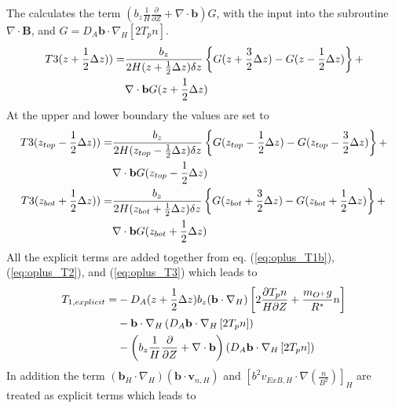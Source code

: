 %
The  calculates the term $\left(b_z
\frac{1}{H} \frac{\partial}{\partial Z} + \nabla \cdot \mathbf{b}
\right) G$, with the input into the subroutine $\nabla \cdot
\mathbf{B}$, and $G = D_A \mathbf{b}\cdot \nabla_H \left[ 2 T_p
n\right]$.
%
\begin{align}
  T3(z + \frac{1}{2} \Delta z)) = & \frac{b_z}{2 H(z + \frac{1}{2} \Delta z) \delta z} \left\{  G(z + \frac{3}{2} \Delta z) -
  G(z - \frac{1}{2} \Delta z)\right\} + \notag \\
  {}& \nabla \cdot \mathbf{b}
  G(z + \frac{1}{2} \Delta z) \label{eq:oplus_T3}
\end{align}
%
At the upper and lower boundary the values are set to
%
\begin{align}
  T3(z_{top} - \frac{1}{2} \Delta z)) = & \frac{b_z}{2 H(z_{top} -\frac{1}{2} \Delta z) \delta z} \left\{  G(z_{top} - \frac{1}{2} \Delta z) -
  G(z_{top} - \frac{3}{2} \Delta z)\right\} + \notag \\
  {}& \nabla \cdot \mathbf{b}
  G(z_{top} - \frac{1}{2} \Delta z) \label{eq:oplus_T3top} \\
  T3(z_{bot} + \frac{1}{2} \Delta z)) =& \frac{b_z}{2 H(z_{bot} +\frac{1}{2} \Delta z) \delta z}
  \left\{  G(z_{bot} + \frac{3}{2} \Delta z) -
  G(z_{bot} + \frac{1}{2} \Delta z)\right\} + \notag \\
  {} & \nabla \cdot \mathbf{b}
  G(z_{bot} + \frac{1}{2} \Delta z) \label{eq:oplus_T3bot}
\end{align}
%
All the explicit terms are added together from eq.
(\ref{eq:oplus_T1b}), (\ref{eq:oplus_T2}), and (\ref{eq:oplus_T3})
which leads to
%
\begin{align}
  T_{1,explicit} = & - D_A(z+\frac{1}{2} \Delta z) b_z ( \mathbf{b} \cdot \nabla_H ) \left[2 \frac{\partial T_p n}{H
 \partial Z} + \frac{m_{O^+}  g }{R^*} n \right] \notag \\
 {} & - \mathbf{b} \cdot \nabla_H \left( D_A \mathbf{b} \cdot \nabla_H
 \left[ 2 T_p n \right] \right)  \notag \\
 {} & - \left(b_z \frac{1}{H} \frac{\partial}{\partial Z} + \nabla \cdot
 \mathbf{b} \right) (D_A \mathbf{b}\cdot \nabla_H \left[ 2 T_p
 n\right]) \label{eq:oplus_exp1}
\end{align}
%
In addition the term $(\mathbf{b}_H \cdot \nabla_H )(\mathbf{b}
\cdot \mathbf{v}_{n,H})$ and $\left[ b^2 v_{ExB,H}\cdot \nabla
(\frac{n}{B^2})\right]_H$ are treated as explicit terms which leads
to
%
